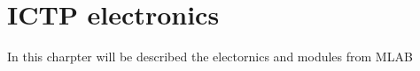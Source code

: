 \documentclass[]{book}
\begin{document}
\chapter{ICTP electronics}

In this charpter will be described the electornics and modules from MLAB 
\end{document}
